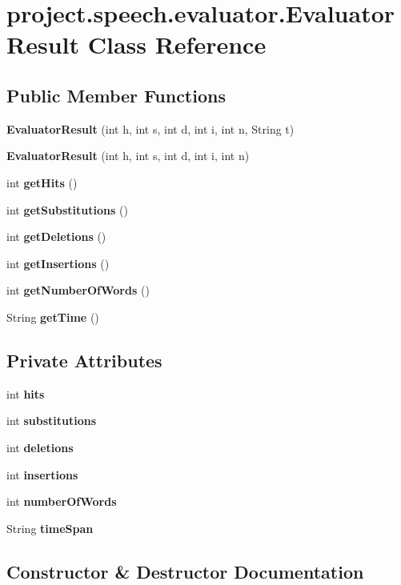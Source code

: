 \section{project.\+speech.\+evaluator.\+Evaluator\+Result Class Reference}
\label{classproject_1_1speech_1_1evaluator_1_1_evaluator_result}
\subsection*{Public Member Functions}
\begin{DoxyCompactItemize}
\item 
{\bf Evaluator\+Result} (int h, int s, int d, int i, int n, String t)
\item 
{\bf Evaluator\+Result} (int h, int s, int d, int i, int n)
\item 
int {\bf get\+Hits} ()
\item 
int {\bf get\+Substitutions} ()
\item 
int {\bf get\+Deletions} ()
\item 
int {\bf get\+Insertions} ()
\item 
int {\bf get\+Number\+Of\+Words} ()
\item 
String {\bf get\+Time} ()
\end{DoxyCompactItemize}
\subsection*{Private Attributes}
\begin{DoxyCompactItemize}
\item 
int {\bf hits}
\item 
int {\bf substitutions}
\item 
int {\bf deletions}
\item 
int {\bf insertions}
\item 
int {\bf number\+Of\+Words}
\item 
String {\bf time\+Span}
\end{DoxyCompactItemize}


\subsection{Constructor \& Destructor Documentation}
